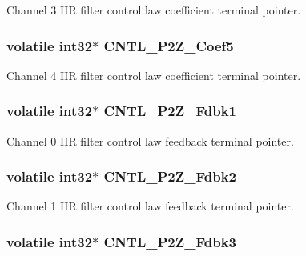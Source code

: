 Channel 3 I\-I\-R filter control law coefficient terminal pointer. \hypertarget{a00009_a5fe3f4dd6aac27512c9e0b6fc843b0b6}{
\subsubsection[{C\-N\-T\-L\-\_\-2\-P2\-Z\-\_\-\-Coef5}]{\setlength{\rightskip}{0pt plus 5cm}volatile int32$\ast$ C\-N\-T\-L\-\_\-P2\-Z\-\_\-\-Coef5}}\label{a00009_a5fe3f4dd6aac27512c9e0b6fc843b0b6}
Channel 4 I\-I\-R filter control law coefficient terminal pointer. \hypertarget{a00009_a9c0418a780375035750c3d4dc16f3ae4}{
\subsubsection[{C\-N\-T\-L\-\_\-2\-P2\-Z\-\_\-\-Fdbk1}]{\setlength{\rightskip}{0pt plus 5cm}volatile int32$\ast$ C\-N\-T\-L\-\_\-P2\-Z\-\_\-\-Fdbk1}}\label{a00009_a9c0418a780375035750c3d4dc16f3ae4}
Channel 0 I\-I\-R filter control law feedback terminal pointer. \hypertarget{a00009_a6092ef1c1c54802bb5e11564f782390d}{
\subsubsection[{C\-N\-T\-L\-\_\-2\-P2\-Z\-\_\-\-Fdbk2}]{\setlength{\rightskip}{0pt plus 5cm}volatile int32$\ast$ C\-N\-T\-L\-\_\-P2\-Z\-\_\-\-Fdbk2}}\label{a00009_a6092ef1c1c54802bb5e11564f782390d}
Channel 1 I\-I\-R filter control law feedback terminal pointer. \hypertarget{a00009_a939782d23ddbf7f45e5e393a65bafcff}{
\subsubsection[{C\-N\-T\-L\-\_\-2\-P2\-Z\-\_\-\-Fdbk3}]{\setlength{\rightskip}{0pt plus 5cm}volatile int32$\ast$ C\-N\-T\-L\-\_\-P2\-Z\-\_\-\-Fdbk3}}\label{a00009_a939782d23ddbf7f45e5e393a65bafcff}

